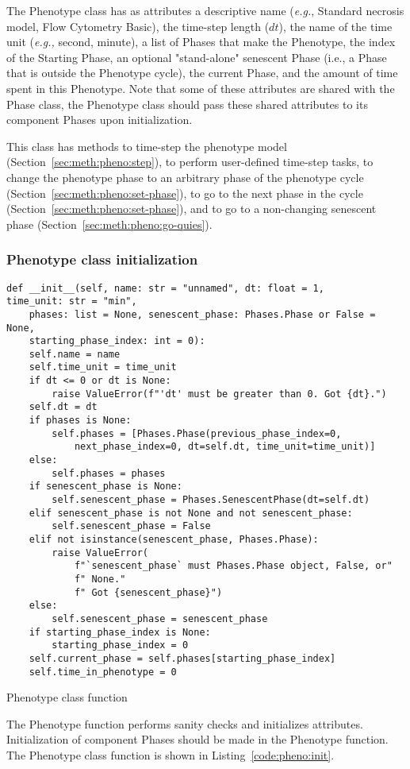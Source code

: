 The Phenotype class has as attributes a descriptive name (\textit{e.g.}, Standard necrosis model, Flow Cytometry Basic), the time-step length ($dt$), the name of the time unit (\textit{e.g.,} second, minute), a list of Phases that make the Phenotype, the index of the Starting Phase, an optional "stand-alone" senescent Phase (i.e., a Phase that is outside the Phenotype cycle), the current Phase, and the amount of time spent in this Phenotype.
Note that some of these attributes are shared with the Phase class, the Phenotype class should pass these shared attributes to its component Phases upon initialization. 

This class has methods to time-step the phenotype model (Section~\ref{sec:meth:pheno:step}), to perform user-defined time-step tasks, to change the phenotype phase to an arbitrary phase of the phenotype cycle (Section~\ref{sec:meth:pheno:set-phase}), to go to the next phase in the cycle (Section~\ref{sec:meth:pheno:set-phase}), and to go to a non-changing senescent phase (Section~\ref{sec:meth:pheno:go-quies}).

\subsubsection{Phenotype class initialization}\label{sec:meth:pheno:init}

\begin{listing}[!htb]
\begin{verbatim}
def __init__(self, name: str = "unnamed", dt: float = 1, 
time_unit: str = "min", 
    phases: list = None, senescent_phase: Phases.Phase or False = None, 
    starting_phase_index: int = 0):
    self.name = name
    self.time_unit = time_unit
    if dt <= 0 or dt is None:
        raise ValueError(f"'dt' must be greater than 0. Got {dt}.")
    self.dt = dt
    if phases is None:
        self.phases = [Phases.Phase(previous_phase_index=0,
            next_phase_index=0, dt=self.dt, time_unit=time_unit)]
    else:
        self.phases = phases
    if senescent_phase is None:
        self.senescent_phase = Phases.SenescentPhase(dt=self.dt)
    elif senescent_phase is not None and not senescent_phase:
        self.senescent_phase = False
    elif not isinstance(senescent_phase, Phases.Phase):
        raise ValueError(
            f"`senescent_phase` must Phases.Phase object, False, or"
            f" None."
            f" Got {senescent_phase}")
    else:
        self.senescent_phase = senescent_phase
    if starting_phase_index is None:
        starting_phase_index = 0
    self.current_phase = self.phases[starting_phase_index]
    self.time_in_phenotype = 0
\end{verbatim}
\caption{Phenotype class  function}\label{code:pheno:init}
\end{listing}
The Phenotype  function performs sanity checks and initializes attributes. Initialization of component Phases should be made in the Phenotype  function. The Phenotype class  function is shown in Listing~\ref{code:pheno:init}.

